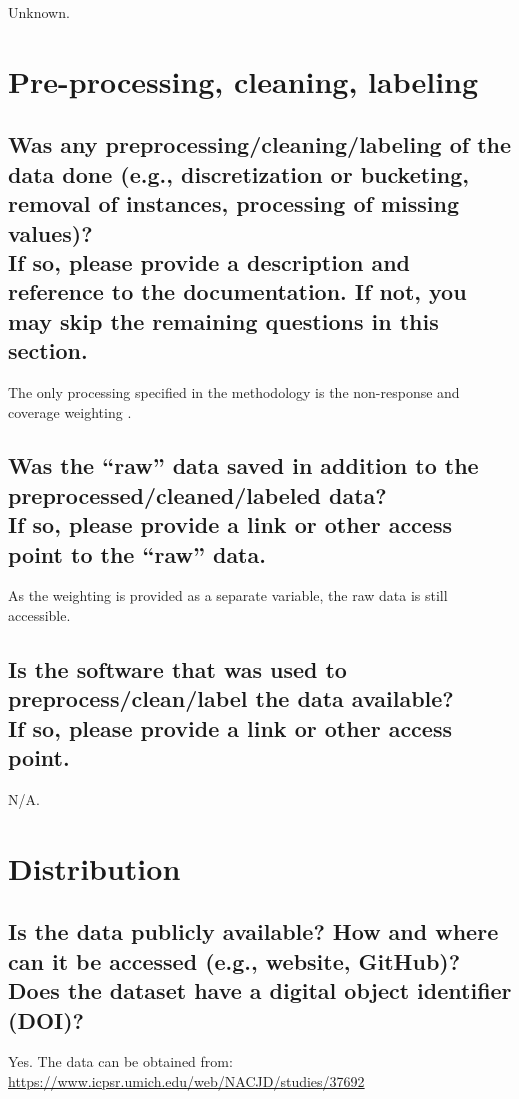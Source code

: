 \documentclass[letterpaper, 10 pt, conference]{ieeeconf}  %
\newcommand{\subtitle}[1]{{\\ \small \normalfont \color{purple} #1}}
\begin{document}
Unknown.

\section{Pre-processing, cleaning, labeling}

\subsection{Was any preprocessing/cleaning/labeling of the data done (e.g., discretization or bucketing, removal of instances, processing of missing values)? \subtitle{If so, please provide a description and reference to the documentation. If not, you may skip the remaining questions in this section.}}

The only processing specified in the methodology is the non-response and coverage weighting \cite{glaze2019methodology}.

\subsection{Was the “raw” data saved in addition to the preprocessed/cleaned/labeled data? \subtitle{If so, please provide a link or other access point to the “raw” data. }}

As the weighting is provided as a separate variable, the raw data is still accessible.

\subsection{Is the software that was used to preprocess/clean/label the data available? \subtitle{If so, please provide a link or other access point.}}

N/A.

\section{Distribution}

\subsection{Is the data publicly available? How and where can it be accessed (e.g., website, GitHub)? \subtitle{Does the dataset have a digital object identifier (DOI)?}}

Yes. The data can be obtained from: \\ \href{https://www.icpsr.umich.edu/web/NACJD/studies/37692}{https://www.icpsr.umich.edu/web/NACJD/studies/37692}
\end{document}

